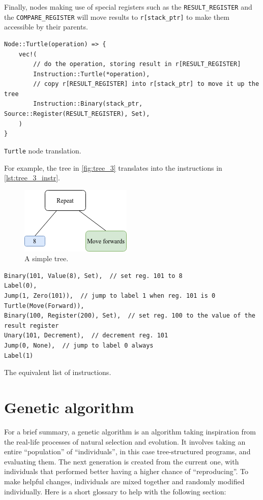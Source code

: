 \documentclass{report}
\newenvironment{code}{\captionsetup{type=listing}}{}
\begin{document}
Finally, nodes making use of special registers such as the \verb|RESULT_REGISTER| and the \verb|COMPARE_REGISTER| will move results to \verb|r[stack_ptr]| to make them accessible by their parents.

\begin{code}
    \begin{verbatim}
Node::Turtle(operation) => {
    vec!(
        // do the operation, storing result in r[RESULT_REGISTER]
        Instruction::Turtle(*operation),
        // copy r[RESULT_REGISTER] into r[stack_ptr] to move it up the tree
        Instruction::Binary(stack_ptr, Source::Register(RESULT_REGISTER), Set),
    )
}
    \end{verbatim}
    \caption{\texttt{Turtle} node translation.}
    \label{lst:turtle_translation}
\end{code}

For example, the tree in \autoref{fig:tree_3} translates into the instructions in \autoref{lst:tree_3_instr}.

\begin{figure}[H]
    \centering
    \includegraphics{tree_3}
    \caption{A simple tree.}
    \label{fig:tree_3}
\end{figure}

\begin{code}
    \begin{verbatim}
Binary(101, Value(8), Set),  // set reg. 101 to 8
Label(0),
Jump(1, Zero(101)),  // jump to label 1 when reg. 101 is 0
Turtle(Move(Forward)),
Binary(100, Register(200), Set),  // set reg. 100 to the value of the result register
Unary(101, Decrement),  // decrement reg. 101
Jump(0, None),  // jump to label 0 always
Label(1)
    \end{verbatim}
    \caption{The equivalent list of instructions.}
    \label{lst:tree_3_instr}
\end{code}

\section{Genetic algorithm}

For a brief summary, a genetic algorithm\cite{genetic_alg} is an algorithm taking inspiration from the real-life processes of natural selection and evolution. It involves taking an entire ``population'' of ``individuals'', in this case tree-structured programs, and evaluating them. The next generation is created from the current one, with individuals that performed better having a higher chance of ``reproducing''. To make helpful changes, individuals are mixed together and randomly modified individually. Here is a short glossary to help with the following section:
\end{document}
